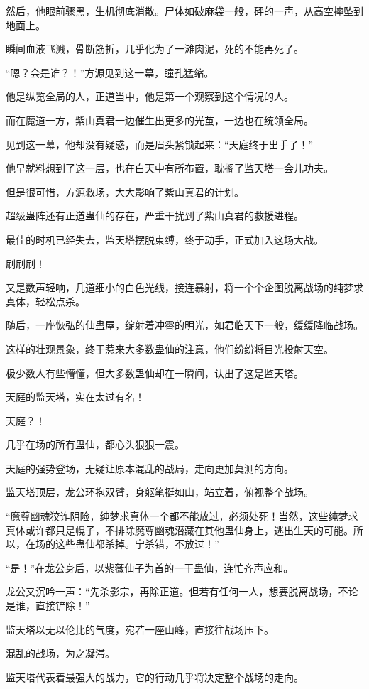 \begin{this_body}
然后，他眼前骤黑，生机彻底消散。尸体如破麻袋一般，砰的一声，从高空摔坠到地面上。

瞬间血液飞溅，骨断筋折，几乎化为了一滩肉泥，死的不能再死了。

“嗯？会是谁？！”方源见到这一幕，瞳孔猛缩。

他是纵览全局的人，正道当中，他是第一个观察到这个情况的人。

而在魔道一方，紫山真君一边催生出更多的光茧，一边也在统领全局。

见到这一幕，他却没有疑惑，而是眉头紧锁起来：“天庭终于出手了！”

他早就料想到了这一层，也在白天中有所布置，耽搁了监天塔一会儿功夫。

但是很可惜，方源救场，大大影响了紫山真君的计划。

超级蛊阵还有正道蛊仙的存在，严重干扰到了紫山真君的救援进程。

最佳的时机已经失去，监天塔摆脱束缚，终于动手，正式加入这场大战。

刷刷刷！

又是数声轻响，几道细小的白色光线，接连暴射，将一个个企图脱离战场的纯梦求真体，轻松点杀。

随后，一座恢弘的仙蛊屋，绽射着冲霄的明光，如君临天下一般，缓缓降临战场。

这样的壮观景象，终于惹来大多数蛊仙的注意，他们纷纷将目光投射天空。

极少数人有些懵懂，但大多数蛊仙却在一瞬间，认出了这是监天塔。

天庭的监天塔，实在太过有名！

天庭？！

几乎在场的所有蛊仙，都心头狠狠一震。

天庭的强势登场，无疑让原本混乱的战局，走向更加莫测的方向。

监天塔顶层，龙公环抱双臂，身躯笔挺如山，站立着，俯视整个战场。

“魔尊幽魂狡诈阴险，纯梦求真体一个都不能放过，必须处死！当然，这些纯梦求真体或许都只是幌子，不排除魔尊幽魂潜藏在其他蛊仙身上，逃出生天的可能。所以，在场的这些蛊仙都杀掉。宁杀错，不放过！”

“是！”在龙公身后，以紫薇仙子为首的一干蛊仙，连忙齐声应和。

龙公又沉吟一声：“先杀影宗，再除正道。但若有任何一人，想要脱离战场，不论是谁，直接铲除！”

监天塔以无以伦比的气度，宛若一座山峰，直接往战场压下。

混乱的战场，为之凝滞。

监天塔代表着最强大的战力，它的行动几乎将决定整个战场的走向。


\end{this_body}
